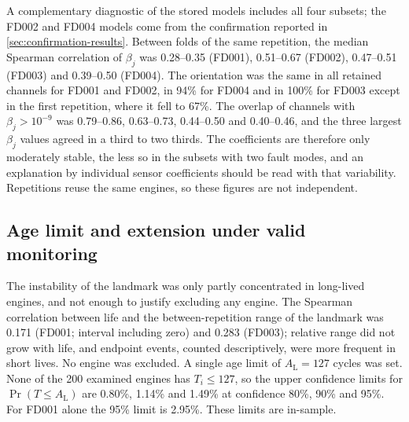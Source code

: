 \documentclass[preprint,12pt]{elsarticle}
\begin{document}
A complementary diagnostic of the stored models includes all four subsets; the FD002 and FD004 models come from the confirmation reported in \cref{sec:confirmation-results}. Between folds of the same repetition, the median Spearman correlation of $\beta_j$ was 0.28--0.35 (FD001), 0.51--0.67 (FD002), 0.47--0.51 (FD003) and 0.39--0.50 (FD004). The orientation was the same in all retained channels for FD001 and FD002, in 94\% for FD004 and in 100\% for FD003 except in the first repetition, where it fell to 67\%. The overlap of channels with $\beta_j>10^{-9}$ was 0.79--0.86, 0.63--0.73, 0.44--0.50 and 0.40--0.46, and the three largest $\beta_j$ values agreed in a third to two thirds. The coefficients are therefore only moderately stable, the less so in the subsets with two fault modes, and an explanation by individual sensor coefficients should be read with that variability. Repetitions reuse the same engines, so these figures are not independent.

\subsection{Age limit and extension under valid monitoring}\label{sec:monitoring-results}

The instability of the landmark was only partly concentrated in long-lived engines, and not enough to justify excluding any engine. The Spearman correlation between life and the between-repetition range of the landmark was 0.171 (FD001; interval including zero) and 0.283 (FD003); relative range did not grow with life, and endpoint events, counted descriptively, were more frequent in short lives. No engine was excluded. A single age limit of $A_{\mathrm L}=127$ cycles was set. None of the 200 examined engines has $T_i\leq127$, so the upper confidence limits for $\Pr(T\leq A_{\mathrm L})$ are 0.80\%, 1.14\% and 1.49\% at confidence 80\%, 90\% and 95\%. For FD001 alone the 95\% limit is 2.95\%. These limits are in-sample.
\end{document}
